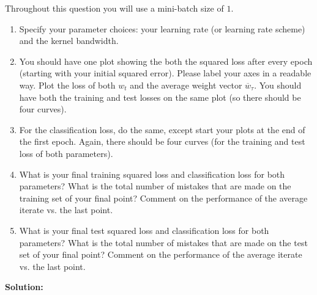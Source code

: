 \documentclass{article}
\newcommand{\solution}{\textbf{\vskip 0.2cm \large Solution:\\}}
\begin{document}
Throughout this question you will use a mini-batch size of $1$.

\begin{enumerate}
	\item Specify your parameter choices: your learning rate (or learning rate scheme) and the kernel bandwidth.
	\item You should have one plot showing the both the squared loss after every epoch (starting with your initial squared error). Please label your axes in a readable way.  Plot the loss of both $w_t$ and the average weight vector $\overline{w}_\tau$. You should have both the training and test losses on the same plot (so there should be four curves).
	\item For the classification loss, do the same, except start your plots at the end of the first epoch. Again, there should be four curves (for the training and test loss of both parameters).
	\item  What is your final training squared loss and classification loss for both parameters? What is the total number of mistakes that are made on the training set of your final point? Comment on the performance of the average iterate vs. the last point.
	\item What is your final test squared loss and classification loss for both parameters? What is the total number of mistakes that are made on the test set of your final point? Comment on the performance of the average iterate vs. the last point.
\end{enumerate}

\solution
\end{document}
